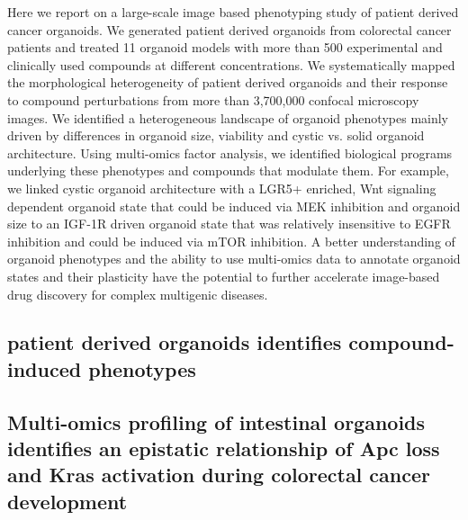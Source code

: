 \begin{flushleft}
Here we report on a large-scale image based phenotyping study of patient derived cancer organoids. We generated patient derived organoids from colorectal cancer patients and treated 11 organoid models with more than 500 experimental and clinically used compounds at different concentrations. We systematically mapped the morphological heterogeneity of patient derived organoids and their response to compound perturbations from more  than  3,700,000  confocal microscopy images. We identified a heterogeneous landscape of organoid phenotypes mainly driven by differences in organoid size, viability and cystic vs. solid organoid architecture. Using multi-omics factor analysis, we identified biological programs underlying these phenotypes and compounds that modulate them. For example, we linked cystic organoid architecture with a LGR5+ enriched, Wnt signaling dependent organoid state that could be induced via MEK inhibition and organoid size to an IGF-1R driven organoid state that was relatively insensitive to EGFR inhibition and could be induced via mTOR inhibition. A better understanding of organoid phenotypes and the ability to use multi-omics data to annotate organoid states and their plasticity have the potential to further accelerate image-based drug discovery for complex multigenic diseases.


\subsection{patient derived organoids identifies compound-induced phenotypes}
\subsection{Multi-omics profiling of intestinal organoids identifies an epistatic relationship of Apc loss and Kras activation during colorectal cancer development}
\end{flushleft}



